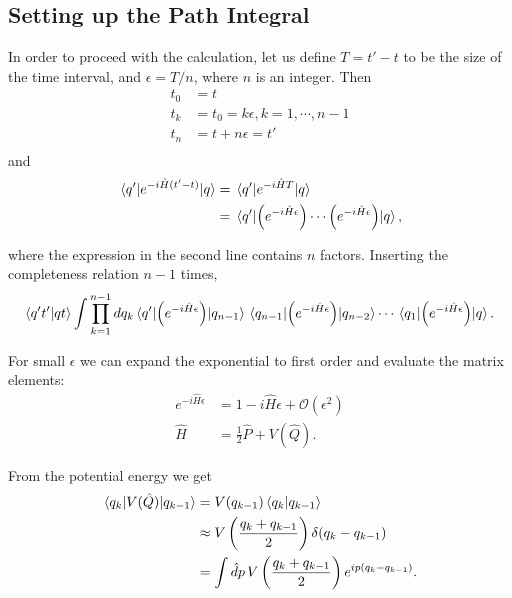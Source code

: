 \documentclass{article}
\numberwithin{equation}{section}
\begin{document}
\subsection{Setting up the Path Integral}

In order to proceed with the calculation, let us define $T=t'-t$ to be the size of the time interval, and $\epsilon=T/n$, where $n$ is an integer. Then
\begin{equation}
\begin{aligned}
    t_0 &= t \\
    t_k &= t_0 = k\epsilon, k=1, \cdots, n-1 \\
    t_n &= t + n\epsilon = t' \\
\end{aligned}
\end{equation}
and 
\begin{equation}
\begin{aligned}
    \mel{q'}{e^{-i\hat{H}(t'-t)}}{q} &= \mel{q'}{e^{-i\hat{H}T}}{q} \\
    &= \mel{q'}{\left(e^{-i\hat{H}\epsilon}\right) \cdots \left(e^{-i\hat{H}\epsilon}\right)}{q},
\end{aligned}
\end{equation}

where the expression in the second line contains $n$ factors. Inserting the completeness relation $n-1$ times,
\begin{equation}
    \braket{q't'}{qt} \int \prod_{k=1}^{n-1} dq_k \mel{q'}{\left(e^{-i\hat{H}\epsilon}\right)}{q_{n-1}} \mel{q_{n-1}}{\left(e^{-i\hat{H}\epsilon}\right)}{q_{n-2}} \cdots \mel{q_1}{\left(e^{-i\hat{H}\epsilon}\right)}{q}.
\end{equation}

For small $\epsilon$ we can expand the exponential to first order and evaluate the matrix elements:
\begin{equation}
\begin{aligned}
    e^{-i\hat{H}\epsilon} &= 1 - i \hat{H} \epsilon + \mathcal{O}(\epsilon^2) \\
    \hat{H} &= \frac{1}{2} \hat{P} + V(\hat{Q}).
\end{aligned}
\end{equation}

From the potential energy we get
\begin{equation}
\begin{aligned}
    \mel{q_k}{V(\hat{Q})}{q_{k-1}} &= V(q_{k-1})\braket{q_k}{q_{k-1}} \\
    &\approx V\left(\frac{q_k + q_{k-1}}{2}\right) \delta(q_k - q_{k-1}) \\
    &= \int \hat{d}p \, V\left(\frac{q_k + q_{k-1}}{2}\right) e^{ip(q_k - q_{k-1})}.
\end{aligned}
\end{equation}
\end{document}

